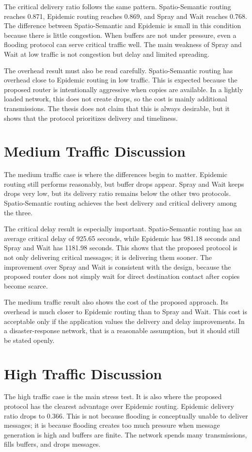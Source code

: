 The critical delivery ratio follows the same pattern. Spatio-Semantic routing reaches 0.871, Epidemic routing reaches 0.869, and Spray and Wait reaches 0.768. The difference between Spatio-Semantic and Epidemic is small in this condition because there is little congestion. When buffers are not under pressure, even a flooding protocol can serve critical traffic well. The main weakness of Spray and Wait at low traffic is not congestion but delay and limited spreading.

The overhead result must also be read carefully. Spatio-Semantic routing has overhead close to Epidemic routing in low traffic. This is expected because the proposed router is intentionally aggressive when copies are available. In a lightly loaded network, this does not create drops, so the cost is mainly additional transmissions. The thesis does not claim that this is always desirable, but it shows that the protocol prioritizes delivery and timeliness.

\section{Medium Traffic Discussion}
The medium traffic case is where the differences begin to matter. Epidemic routing still performs reasonably, but buffer drops appear. Spray and Wait keeps drops very low, but its delivery ratio remains below the other two protocols. Spatio-Semantic routing achieves the best delivery and critical delivery among the three.

The critical delay result is especially important. Spatio-Semantic routing has an average critical delay of 925.65 seconds, while Epidemic has 981.18 seconds and Spray and Wait has 1181.98 seconds. This shows that the proposed protocol is not only delivering critical messages; it is delivering them sooner. The improvement over Spray and Wait is consistent with the design, because the proposed router does not simply wait for direct destination contact after copies become scarce.

The medium traffic result also shows the cost of the proposed approach. Its overhead is much closer to Epidemic routing than to Spray and Wait. This cost is acceptable only if the application values the delivery and delay improvements. In a disaster-response network, that is a reasonable assumption, but it should still be stated openly.

\section{High Traffic Discussion}
The high traffic case is the main stress test. It is also where the proposed protocol has the clearest advantage over Epidemic routing. Epidemic delivery ratio drops to 0.366. This is not because flooding is conceptually unable to deliver messages; it is because flooding creates too much pressure when message generation is high and buffers are finite. The network spends many transmissions, fills buffers, and drops messages.

